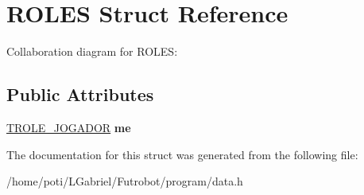 \hypertarget{structROLES}{}\section{R\+O\+L\+ES Struct Reference}
\label{structROLES}


Collaboration diagram for R\+O\+L\+ES\+:
\subsection*{Public Attributes}
\begin{DoxyCompactItemize}
\item 
\hyperlink{structTROLE__JOGADOR}{T\+R\+O\+L\+E\+\_\+\+J\+O\+G\+A\+D\+OR} {\bfseries me}\hypertarget{structROLES_aee9a55947d9f32ead1e695de67a0b5aa}{}\label{structROLES_aee9a55947d9f32ead1e695de67a0b5aa}

\end{DoxyCompactItemize}


The documentation for this struct was generated from the following file\+:\begin{DoxyCompactItemize}
\item 
/home/poti/\+L\+Gabriel/\+Futrobot/program/data.\+h\end{DoxyCompactItemize}
